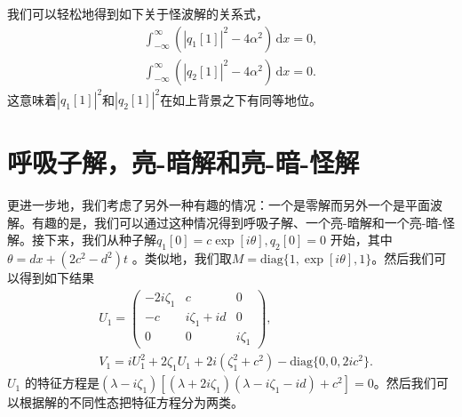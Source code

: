 \documentclass[11pt,a4paper]{ctexart}
\newcommand\dx{\,\mathrm{d}x}%
\begin{document}
我们可以轻松地得到如下关于怪波解的关系式，
\begin{align*}
	\int_{-\infty} ^{\infty} (|q_{1} [1]|^{2} -4\alpha^{2} )\dx=0, \\
	\int_{-\infty} ^{\infty} (|q_{2} [1]|^{2} -4\alpha^{2} )\dx=0.\tag{10}
\end{align*}
这意味着$ |q_{1} [1] |^{2} $和$ |q_{2} [1] |^{2} $在如上背景之下有同等地位。

\section{呼吸子解，亮-暗解和亮-暗-怪解}

更进一步地，我们考虑了另外一种有趣的情况：一个是零解而另外一个是平面波解。有趣的是，我们可以通过这种情况得到呼吸子解、一个亮-暗解和一个亮-暗-怪解。接下来，我们从种子解$ q_{1} [0]=c\exp[i\theta],q_{2} [0]=0 $ 开始，其中$ \theta=dx+(2c^{2} -d^{2} )t $ 。类似地，我们取$ M=\text{diag}\{1,\exp[i\theta],1\} $。然后我们可以得到如下结果
\begin{align*}
	 & U_{1} = \begin{pmatrix}
		           -2i\zeta_{1} & c              & 0          \\
		           -c           & i\zeta_{1} +id & 0          \\
		           0            & 0              & i\zeta_{1}
	           \end{pmatrix},                                            \\
	 & V_{1} =iU_{1} ^{2} +2\zeta_{1} U_{1} +2i(\zeta_{1} ^{2} +c^{2}) -\text{diag}\{0,0,2ic^{2} \}.
\end{align*}
$ U_{1}  $ 的特征方程是$ (\lambda-i\zeta_{1} )[(\lambda+2i\zeta_{1} )(\lambda-i\zeta_{1} -id)+c^{2} ]=0 $。然后我们可以根据解的不同性态把特征方程分为两类。
\end{document}
